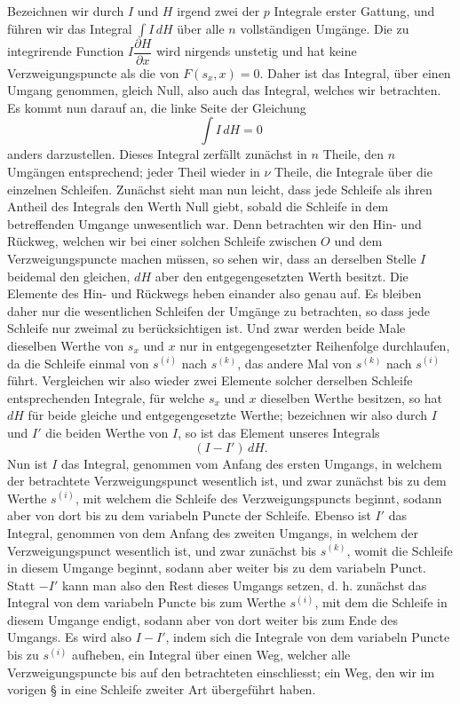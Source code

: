 \documentclass[10pt]{article}
\begin{document}
Bezeichnen wir durch \(I\) und \(H\) irgend zwei der \(p\) Integrale erster Gattung, und führen wir das Integral \(\int I\,dH\) über alle \(n\) vollständigen Umgänge. Die zu integrirende Function \(I\dfrac{\partial H}{\partial x}\) wird nirgends unstetig und hat keine Verzweigungspuncte als die von \(F(s_x,x)=0\). Daher ist das Integral, über einen Umgang genommen, gleich Null, also auch das Integral, welches wir betrachten. Es kommt nun darauf an, die linke Seite der Gleichung
\[
\int I\,dH=0
\]
anders darzustellen. Dieses Integral zerfällt zunächst in \(n\) Theile, den \(n\) Umgängen entsprechend; jeder Theil wieder in \(\nu\) Theile, die Integrale über die einzelnen Schleifen. Zunächst sieht man nun leicht, dass jede Schleife als ihren Antheil des Integrals den Werth Null giebt, sobald die Schleife in dem betreffenden Umgange unwesentlich war. Denn betrachten wir den Hin- und Rückweg, welchen wir bei einer solchen Schleife zwischen \(O\) und dem Verzweigungspuncte machen müssen, so sehen wir, dass an derselben Stelle \(I\) beidemal den gleichen, \(dH\) aber den entgegengesetzten Werth besitzt. Die Elemente des Hin- und Rückwegs heben einander also genau auf. Es bleiben daher nur die wesentlichen Schleifen der Umgänge zu betrachten, so dass jede Schleife nur zweimal zu berücksichtigen ist. Und zwar werden beide Male dieselben Werthe von \(s_x\) und \(x\) nur in entgegengesetzter Reihenfolge durchlaufen, da die Schleife einmal von \(s^{(i)}\) nach \(s^{(k)}\), das andere Mal von \(s^{(k)}\) nach \(s^{(i)}\) führt. Vergleichen wir also wieder zwei Elemente solcher derselben Schleife entsprechenden Integrale, für welche \(s_x\) und \(x\) dieselben Werthe besitzen, so hat \(dH\) für beide gleiche und entgegengesetzte Werthe; bezeichnen wir also durch \(I\) und \(I'\) die beiden Werthe von \(I\), so ist das Element unseres Integrals
\[
(I-I')\,dH.
\]
Nun ist \(I\) das Integral, genommen vom Anfang des ersten Umgangs, in welchem der betrachtete Verzweigungspunct wesentlich ist, und zwar zunächst bis zu dem Werthe \(s^{(i)}\), mit welchem die Schleife des Verzweigungspuncts beginnt, sodann aber von dort bis zu dem variabeln Puncte der Schleife. Ebenso ist \(I'\) das Integral, genommen von dem Anfang des zweiten Umgangs, in welchem der Verzweigungspunct wesentlich ist, und zwar zunächst bis \(s^{(k)}\), womit die Schleife in diesem Umgange beginnt, sodann aber weiter bis zu dem variabeln Punct. Statt \(-I'\) kann man also den Rest dieses Umgangs setzen, d. h. zunächst das Integral von dem variabeln Puncte bis zum Werthe \(s^{(i)}\), mit dem die Schleife in diesem Umgange endigt, sodann aber von dort weiter bis zum Ende des Umgangs. Es wird also \(I-I'\), indem sich die Integrale von dem variabeln Puncte bis zu \(s^{(i)}\) aufheben, ein Integral über einen Weg, welcher alle Verzweigungspuncte bis auf den betrachteten einschliesst; ein Weg, den wir im vorigen \S{} in eine Schleife zweiter Art übergeführt haben.
\end{document}
